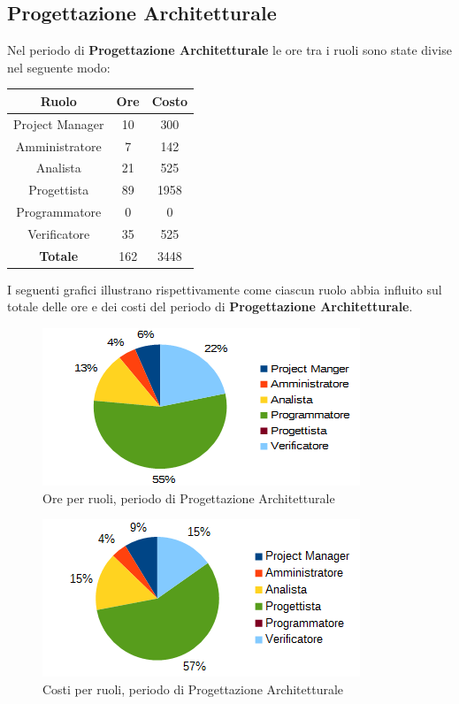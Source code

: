 	\subsection{Progettazione Architetturale}
	Nel periodo di \textbf{Progettazione Architetturale} le ore tra i ruoli sono state divise nel seguente modo: \\
	\begin{table}[H]
		\centering
		\begin{tabular}{|c|c|c|}
			\hline
			\textbf{Ruolo}		& \textbf{Ore}	& \textbf{Costo} \\
			\hline
			Project Manager		& 10			& 300	\\
			Amministratore		& 7				& 142	\\
			Analista			& 21			& 525	\\
			Progettista			& 89			& 1958	\\
			Programmatore		& 0				& 0	\\
			Verificatore		& 35			& 525	\\
			\hline
			\textbf{Totale}		& 162			& 3448	\\
			\hline
		\end{tabular}
		\end{table}
	I seguenti grafici illustrano rispettivamente come ciascun ruolo abbia influito sul totale
delle ore e dei costi del periodo di \textbf{Progettazione Architetturale}. \\
	\begin{figure}[H]
		\centering
		\includegraphics[width=1\linewidth]{immagini/grafici/progettazione_architetturale-torta.png}
		\caption{Ore per ruoli, periodo di Progettazione Architetturale}
	\end{figure}
	\begin{figure}[H]
		\centering
		\includegraphics[width=1\linewidth]{immagini/grafici/progettazione_architetturale-torta-costo.png}
		\caption{Costi per ruoli, periodo di Progettazione Architetturale}
	\end{figure}
